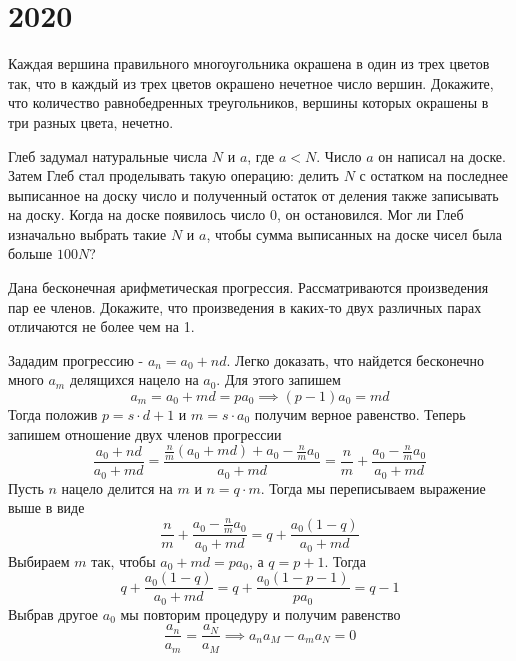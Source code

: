 \documentclass[11pt, a4paper]{template}
\begin{document}
\chapter{2020}

\begin{exercise}[M2593]
Каждая вершина правильного многоугольника окрашена в один из трех цветов так, что в каждый из трех цветов окрашено нечетное число вершин. Докажите, что количество равнобедренных треугольников, вершины которых окрашены в три разных цвета, нечетно.
\end{exercise}

\begin{exercise}[M2601]
Глеб задумал натуральные числа $N$ и $a$, где $a < N$. Число $a$ он написал на доске. Затем Глеб стал проделывать такую операцию: делить $N$ с остатком на последнее выписанное на доску число и полученный остаток от деления также записывать на доску. Когда на доске
появилось число 0, он остановился. Мог ли Глеб изначально выбрать такие $N$ и $a$,
чтобы сумма выписанных на доске чисел была больше $100N$?
\end{exercise}

\begin{exercise}[2627]
Дана бесконечная арифметическая прогрессия. Рассматриваются произведения пар ее членов. Докажите, что произведения в каких-то двух различных парах отличаются не более чем на 1.
\end{exercise}

\begin{solution}
Зададим прогрессию - $a_{n} = a_{0} + nd$. Легко доказать, что найдется бесконечно много $a_{m}$ делящихся нацело на $a_{0}$. Для этого запишем
$$
a_{m} = a_{0} + md = pa_{0} \implies (p-1)a_{0} = md
$$
Тогда положив $p = s \cdot d+1$ и $m = s \cdot a_{0}$ получим верное равенство. Теперь запишем отношение двух членов прогрессии
$$
\frac{a_{0} + nd}{a_{0} + md} = \frac{\frac{n}{m}(a_{0}+md) + a_{0} - \frac{n}{m}a_{0}}{a_{0} + md} = \frac{n}{m} + \frac{a_{0} - \frac{n}{m}a_{0}}{a_{0} + md}
$$
Пусть $n$ нацело делится на $m$ и $n = q \cdot m$. Тогда мы переписываем выражение выше в виде
$$
\frac{n}{m} + \frac{a_{0} - \frac{n}{m}a_{0}}{a_{0} + md} = q + \frac{a_{0}(1 - q)}{a_{0} + md}
$$
Выбираем $m$ так, чтобы $a_{0} + md = pa_{0}$, а $q = p+1$. Тогда
$$
q + \frac{a_{0}(1 - q)}{a_{0} + md} = q + \frac{a_{0}(1 - p - 1)}{pa_{0}} = q - 1
$$
Выбрав другое $a_{0}$ мы повторим процедуру и получим равенство
$$
\frac{a_{n}}{a_{m}} = \frac{a_{N}}{a_{M}} \implies a_{n}a_{M} - a_{m}a_{N} = 0
$$
\end{solution}
\end{document}
